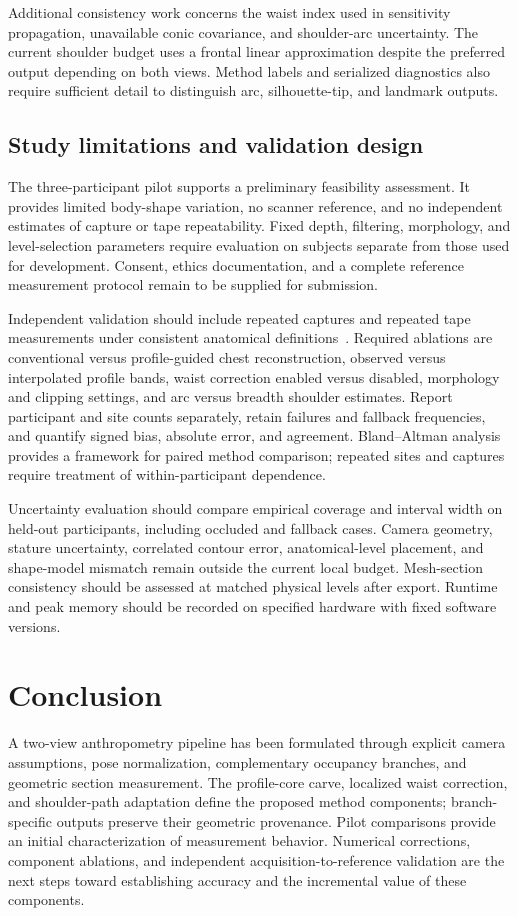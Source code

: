 \documentclass[11pt,a4paper]{article}
\numberwithin{equation}{section}
\begin{document}
Additional consistency work concerns the waist index used in sensitivity propagation, unavailable conic covariance, and shoulder-arc uncertainty. The current shoulder budget uses a frontal linear approximation despite the preferred output depending on both views. Method labels and serialized diagnostics also require sufficient detail to distinguish arc, silhouette-tip, and landmark outputs.

\subsection{Study limitations and validation design}
The three-participant pilot supports a preliminary feasibility assessment. It provides limited body-shape variation, no scanner reference, and no independent estimates of capture or tape repeatability. Fixed depth, filtering, morphology, and level-selection parameters require evaluation on subjects separate from those used for development. Consent, ethics documentation, and a complete reference measurement protocol remain to be supplied for submission.

Independent validation should include repeated captures and repeated tape measurements under consistent anatomical definitions~\cite{iso8559}. Required ablations are conventional versus profile-guided chest reconstruction, observed versus interpolated profile bands, waist correction enabled versus disabled, morphology and clipping settings, and arc versus breadth shoulder estimates. Report participant and site counts separately, retain failures and fallback frequencies, and quantify signed bias, absolute error, and agreement. Bland--Altman analysis~\cite{bland1986} provides a framework for paired method comparison; repeated sites and captures require treatment of within-participant dependence.

Uncertainty evaluation should compare empirical coverage and interval width on held-out participants, including occluded and fallback cases. Camera geometry, stature uncertainty, correlated contour error, anatomical-level placement, and shape-model mismatch remain outside the current local budget. Mesh-section consistency should be assessed at matched physical levels after export. Runtime and peak memory should be recorded on specified hardware with fixed software versions.

\section{Conclusion}
A two-view anthropometry pipeline has been formulated through explicit camera assumptions, pose normalization, complementary occupancy branches, and geometric section measurement. The profile-core carve, localized waist correction, and shoulder-path adaptation define the proposed method components; branch-specific outputs preserve their geometric provenance. Pilot comparisons provide an initial characterization of measurement behavior. Numerical corrections, component ablations, and independent acquisition-to-reference validation are the next steps toward establishing accuracy and the incremental value of these components.
\end{document}
